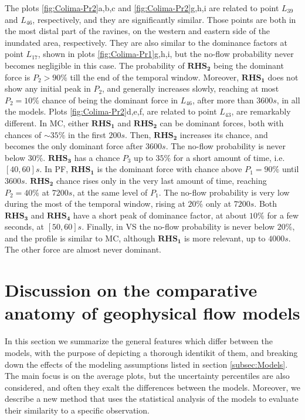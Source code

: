 \documentclass{article}
\begin{document}
The plots \ref{fig:Colima-Pr2}a,b,c and \ref{fig:Colima-Pr2}g,h,i are related to point $L_{39}$ and $L_{46}$, respectively, and they are significantly similar. Those points are both in the most distal part of the ravines, on the western and eastern side of the inundated area, respectively. They are also similar to the dominance factors at point $L_{17}$, shown in plots \ref{fig:Colima-Pr1}g,h,i, but the no-flow probability never becomes negligible in this case. The probability of $\boldsymbol{RHS_2}$ being the dominant force is $P_2>90\%$ till the end of the temporal window. Moreover, $\boldsymbol{RHS_1}$ does not show any initial peak in $P_2$, and generally increases slowly, reaching at most $P_2=10\%$ chance of being the dominant force in $L_{46}$, after more than $3600 s$, in all the models. Plots \ref{fig:Colima-Pr2}d,e,f, are related to point $L_{43}$, are remarkably different. In MC, either $\boldsymbol{RHS_1}$ and $\boldsymbol{RHS_2}$ can be dominant forces, both with chances of $\sim 35\%$ in the first $200 s$. Then, $\boldsymbol{RHS_2}$ increases its chance, and becomes the only dominant force after $3600 s$. The no-flow probability is never below $30\%$. $\boldsymbol{RHS_3}$ has a chance $P_3$ up to $35\%$ for a short amount of time, i.e. $[40, 60] s$. In PF, $\boldsymbol{RHS_1}$ is the dominant force with chance above $P_1=90\%$ until $3600 s$. $\boldsymbol{RHS_2}$ chance rises only in the very last amount of time, reaching $P_2=40\%$ at $7200 s$, at the same level of $P_1$. The no-flow probability is very low during the most of the temporal window, rising at $20\%$ only at $7200 s$. Both $\boldsymbol{RHS_3}$ and $\boldsymbol{RHS_4}$ have a short peak of dominance factor, at about $10\%$ for a few seconds, at $[50,60] s$. Finally, in VS the no-flow probability is never below $20\%$, and the profile is similar to MC, although $\boldsymbol{RHS_1}$ is more relevant, up to $4000 s$. The other force are almost never dominant.


\section{Discussion on the comparative anatomy of geophysical flow models}
In this section we summarize the general features which differ between the models, with the purpose of depicting a thorough identikit of them, and breaking down the effects of the modeling assumptions listed in section \ref{subsec:Models}. The main focus is on the average plots, but the uncertainty percentiles are also considered, and often they exalt the differences between the models. Moreover, we describe a new method that uses the statistical analysis of the models to evaluate their similarity to a specific observation.
\end{document}
